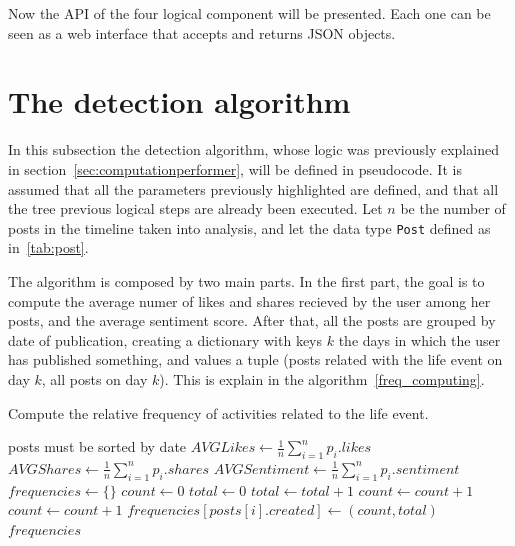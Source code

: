 Now the API of the four logical component will be presented. Each one can be seen as a web interface that accepts and returns JSON objects.

\section{The detection algorithm}
\label{sec:alg}

In this subsection the detection algorithm, whose logic was previously explained in section~\ref{sec:computationperformer}, will be defined in pseudocode. It is assumed that all the parameters previously highlighted are defined, and that all the tree previous logical steps are already been executed. Let $n$ be the number of posts in the timeline taken into analysis, and let the data type \texttt{Post} defined as in~\ref{tab:post}.

The algorithm is composed by two main parts. In the first part, the goal is to compute the average numer of likes and shares recieved by the user among her posts, and the average sentiment score. After that, all the posts are grouped by date of publication, creating a dictionary with keys $k$ the days in which the user has published something, and values a tuple (posts related with the life event on day $k$, all posts on day $k$). This is explain in the algorithm~\ref{freq_computing}.

\begin{algorithm}
\caption{Compute the relative frequency of activities related to the life event.}
\label{freq_computing}
\begin{algorithmic}[1]
\Require posts must be sorted by date
\State $AVGLikes \gets \frac{1}{n} \sum_{i=1}^n p_i.likes $
\State $AVGShares \gets \frac{1}{n} \sum_{i=1}^n p_i.shares $
\State $AVGSentiment \gets \frac{1}{n} \sum_{i=1}^n p_i.sentiment$
\State $frequencies \gets \{\}$
\State $count \gets 0$
\State $total \gets 0$
	\State $total \gets total + 1$
		\State $count \gets count + 1$
		\State $count \gets count + 1$
	\EndIf
		\State $frequencies[posts[i].created] \gets (count, total)$
	\EndIf
\EndFor
\Return $frequencies$
\EndFunction 
\end{algorithmic}
\end{algorithm}

